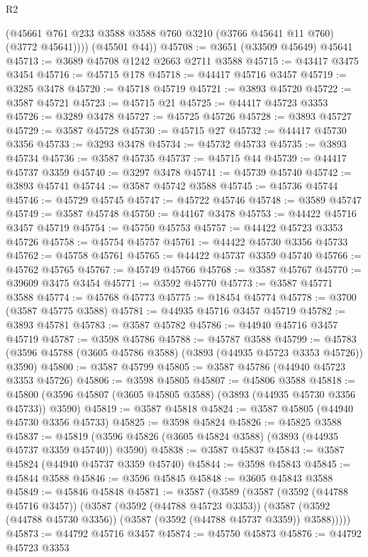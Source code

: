 \begin{lexlean}{R2}
\begin{coremodule}
          (@45661 @761 @233 @3588 @3588 @760 @3210 (@3766 @45641 @11 @760) (@3772 @45641))))
      (@45501 @44))
@45708 := @3651 (@33509 @45649) @45641
@45713 := @3689 @45708 @1242 @2663 @2711 @3588
@45715 := @43417 @3475 @3454
@45716 := @45715 @178
@45718 := @44417 @45716 @3457
@45719 := @3285 @3478
@45720 := @45718 @45719
@45721 := @3893 @45720
@45722 := @3587 @45721
@45723 := @45715 @21
@45725 := @44417 @45723 @3353
@45726 := @3289 @3478
@45727 := @45725 @45726
@45728 := @3893 @45727
@45729 := @3587 @45728
@45730 := @45715 @27
@45732 := @44417 @45730 @3356
@45733 := @3293 @3478
@45734 := @45732 @45733
@45735 := @3893 @45734
@45736 := @3587 @45735
@45737 := @45715 @44
@45739 := @44417 @45737 @3359
@45740 := @3297 @3478
@45741 := @45739 @45740
@45742 := @3893 @45741
@45744 := @3587 @45742 @3588
@45745 := @45736 @45744
@45746 := @45729 @45745
@45747 := @45722 @45746
@45748 := @3589 @45747
@45749 := @3587 @45748
@45750 := @44167 @3478
@45753 := @44422 @45716 @3457 @45719
@45754 := @45750 @45753
@45757 := @44422 @45723 @3353 @45726
@45758 := @45754 @45757
@45761 := @44422 @45730 @3356 @45733
@45762 := @45758 @45761
@45765 := @44422 @45737 @3359 @45740
@45766 := @45762 @45765
@45767 := @45749 @45766
@45768 := @3587 @45767
@45770 := @39609 @3475 @3454
@45771 := @3592 @45770
@45773 := @3587 @45771 @3588
@45774 := @45768 @45773
@45775 := @18454 @45774
@45778 := @3700 (@3587 @45775 @3588)
@45781 := @44935 @45716 @3457 @45719
@45782 := @3893 @45781
@45783 := @3587 @45782
@45786 := @44940 @45716 @3457 @45719
@45787 := @3598 @45786
@45788 := @45787 @3588
@45799 := @45783 (@3596 @45788 (@3605 @45786 @3588) (@3893 (@44935 @45723 @3353 @45726)) @3590)
@45800 := @3587 @45799
@45805 := @3587 @45786 (@44940 @45723 @3353 @45726)
@45806 := @3598 @45805
@45807 := @45806 @3588
@45818 := @45800 (@3596 @45807 (@3605 @45805 @3588) (@3893 (@44935 @45730 @3356 @45733)) @3590)
@45819 := @3587 @45818
@45824 := @3587 @45805 (@44940 @45730 @3356 @45733)
@45825 := @3598 @45824
@45826 := @45825 @3588
@45837 := @45819 (@3596 @45826 (@3605 @45824 @3588) (@3893 (@44935 @45737 @3359 @45740)) @3590)
@45838 := @3587 @45837
@45843 := @3587 @45824 (@44940 @45737 @3359 @45740)
@45844 := @3598 @45843
@45845 := @45844 @3588
@45846 := @3596 @45845
@45848 := @3605 @45843 @3588
@45849 := @45846 @45848
@45871 := @3587
    (@3589
      (@3587
        (@3592 (@44788 @45716 @3457))
        (@3587
          (@3592 (@44788 @45723 @3353))
          (@3587 (@3592 (@44788 @45730 @3356)) (@3587 (@3592 (@44788 @45737 @3359)) @3588)))))
@45873 := @44792 @45716 @3457
@45874 := @45750 @45873
@45876 := @44792 @45723 @3353

\end{coremodule}
\end{lexlean}
